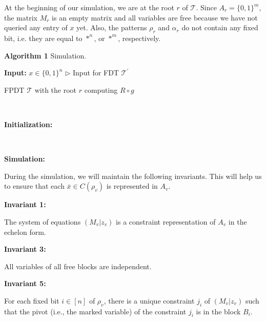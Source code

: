 At the beginning of our simulation, we are at the root $r$ of $\mathcal{T}$.
Since $A_{r}=\{0,1\}^{m}$, the matrix $M_{r}$ is an empty matrix and all variables are free because we have not queried any entry of $x$ yet.
Also, the patterns $\rho_{r}$ and $\alpha_{r}$ do not contain any fixed bit, i.e. they are equal to $*^{n}$, or $*^{m}$, respectively.\par




\textbf{Algorithm 1}  Simulation.


\textbf{Input:} $x\in\{0,1\}^{n}$  $\triangleright$ Input for FDT $\mathcal{T}^{\prime}$\par





FPDT $\mathcal{T}$ with the root $r$ computing $R\circ g$\par



 



\textbf{Initialization:}\par





 



\textbf{Simulation:}\par








During the simulation, we will maintain the following invariants.
This will help us to ensure that each $\bar{x}\in C(\rho_{v})$ is represented in $A_{v}$.\par


\textbf{ Invariant 1:}



The system of equations $(M_{v}|z_{v})$ is a constraint representation of $A_{v}$ in the echelon form.\par



\textbf{ Invariant 3:}



All variables of all free blocks are independent.\par



\textbf{ Invariant 5:}



For each fixed bit $i\in[n]$ of $\rho_{v}$, there is a unique constraint $j_{i}$ of $(M_{v}|z_{v})$ such that the pivot (i.e., the marked variable) of the constraint $j_{i}$ is in the block $B_{i}$.\par



